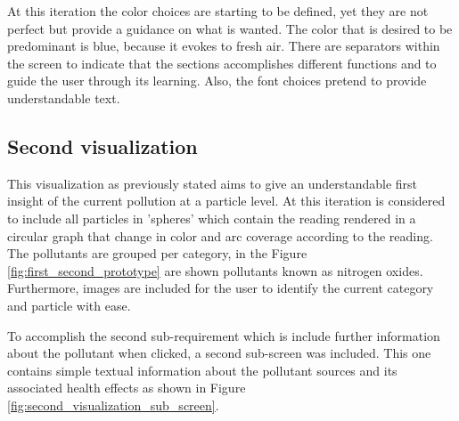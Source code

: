 At this iteration the color choices are starting to be defined, yet they are not perfect but provide a guidance on what is wanted. The color that is desired to be predominant is blue, because it evokes to fresh air. There are separators within the screen to indicate that the sections accomplishes different functions and to guide the user through its learning. Also, the font choices pretend to provide understandable text. 

\subsection{Second visualization}
This visualization as previously stated aims to give an understandable first insight of the current pollution at a particle level. At this iteration is considered to include all particles in 'spheres' which contain the reading rendered in a circular graph that change in color and arc coverage according to the reading. The pollutants are grouped per category, in the Figure \ref{fig:first_second_prototype} are shown pollutants known as nitrogen oxides. Furthermore, images are included for the user to identify the current category and particle with ease.

To accomplish the second sub-requirement which is include further information about the pollutant when clicked, a second sub-screen was included. This one contains simple textual information about the pollutant sources and its associated health effects as shown in Figure \ref{fig:second_visualization_sub_screen}. 

